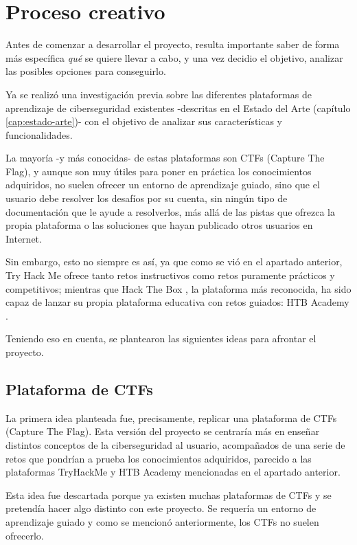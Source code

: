     \section{Proceso creativo}
        \label{sec:proceso-creativo}

        Antes de comenzar a desarrollar el proyecto, resulta importante saber de forma más específica \textit{qué} se quiere llevar a cabo, y una vez decidio el objetivo, analizar las posibles opciones para conseguirlo.
        
        Ya se realizó una investigación previa sobre las diferentes plataformas de aprendizaje de ciberseguridad existentes -descritas en el Estado del Arte (capítulo \ref{cap:estado-arte})- con el objetivo de analizar sus características y funcionalidades.
        
        La mayoría -y más conocidas- de estas plataformas son CTFs (Capture The Flag), y aunque son muy útiles para poner en práctica los conocimientos adquiridos, no suelen ofrecer un entorno de aprendizaje guiado, sino que el usuario debe resolver los desafíos por su cuenta, sin ningún tipo de documentación que le ayude a resolverlos, más allá de las pistas que ofrezca la propia plataforma o las soluciones que hayan publicado otros usuarios en Internet.

        Sin embargo, esto no siempre es así, ya que como se vió en el apartado anterior, Try Hack Me \cite{tryhackme} ofrece tanto retos instructivos como retos puramente prácticos y competitivos; mientras que Hack The Box \cite{hackthebox}, la plataforma más reconocida, ha sido capaz de lanzar su propia plataforma educativa con retos guiados: HTB Academy \cite{hackthebox-academy}.

        Teniendo eso en cuenta, se plantearon las siguientes ideas para afrontar el proyecto.

        \subsection{Plataforma de CTFs}

            La primera idea planteada fue, precisamente, replicar una plataforma de CTFs (Capture The Flag). Esta versión del proyecto se centraría más en enseñar distintos conceptos de la ciberseguridad al usuario, acompañados de una serie de retos que pondrían a prueba los conocimientos adquiridos, parecido a las plataformas TryHackMe y HTB Academy mencionadas en el apartado anterior.

            Esta idea fue descartada porque ya existen muchas plataformas de CTFs y se pretendía hacer algo distinto con este proyecto. Se requería un entorno de aprendizaje guiado y como se mencionó anteriormente, los CTFs no suelen ofrecerlo.

